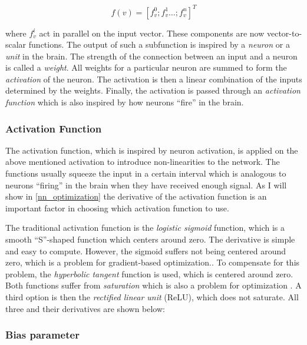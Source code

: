 $$ f(v) =  [f_{v}^{0};f_{v}^{1}\ldots;f_{v}^{n}]^T $$ 

where $f_v^{i}$ act in parallel on the input vector. These components are now vector-to-scalar functions. The output of such a subfunction is inspired by a \emph{neuron} or a \emph{unit} in the brain. The strength of the connection between an input and a neuron is called a \emph{weight}. All weights for a particular neuron are summed to form the \emph{activation} of the neuron. The activation is then a linear combination of the inputs determined by the weights. Finally, the activation is passed through an \emph{activation function} which is also inspired by how neurons ``fire'' in the brain. 

\subsubsection{Activation Function}

The activation function, which is inspired by neuron activation, is applied on the above mentioned activation to introduce non-linearities to the network. The functions usually squeeze the input in a certain interval which is analogous to neurons ``firing'' in the brain when they have received enough signal. As I will show in \autoref{nn_optimization} the derivative of the activation function is an important factor in choosing which activation function to use.

The traditional activation function is the \emph{logistic sigmoid} function, which is a smooth ``S''-shaped function which centers around zero. The derivative is simple and easy to compute. However, the sigmoid suffers not being centered around zero, which is a problem for gradient-based optimization.\citep[p. 66]{dlbook}. To compensate for this problem, the \emph{hyperbolic tangent} function is used, which is centered around zero. Both functions suffer from \emph{saturation} which is also a problem for optimization \cite{activations}. A third option is then the \emph{rectified linear unit} (ReLU), which does not saturate. All three and their derivatives are shown below:

\begin{center}
\end{center}


\subsubsection{Bias parameter}




